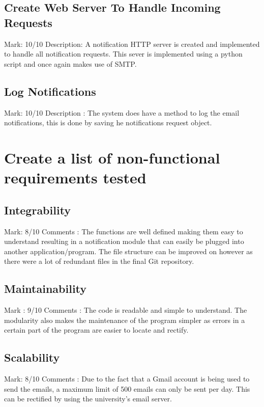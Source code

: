 \documentclass[11pt]{article}
\begin{document}
	\subsection{Create Web Server To Handle Incoming Requests} 
		Mark: 10/10\newline
		Description: A notification HTTP server is created and implemented to handle all notification requests. This sever is implemented using a python script and once again makes use of SMTP.
		

	\subsection{Log Notifications} 
		Mark: 10/10\newline
		Description : The system does have a method to log the email notifications, this is done by saving he notifications request object.
		


\section{Create a list of non-functional requirements tested}
	\subsection{Integrability}
		Mark: 8/10\newline
		Comments : The functions are well defined making them easy to understand resulting in a notification module that can easily be plugged into another application/program. The file structure can be improved on however as there were a lot of redundant files in the final Git repository.
		

	\subsection{Maintainability}
		Mark : 9/10\newline
		Comments : The code is readable and simple to understand. The modularity also makes the maintenance of the program simpler as errors in a certain part of the program are easier to locate and rectify. 
		

	\subsection{Scalability}
		Mark: 8/10\newline
		Comments : Due to the fact that a Gmail account is being used to send the emails, a maximum limit of 500 emails can only be sent per day. This can be rectified by using the university's email server.
		
\end{document}
